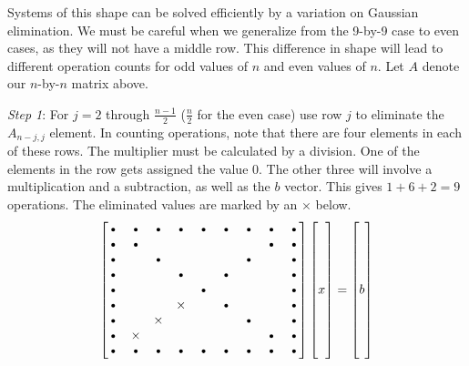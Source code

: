 \documentclass[12pt]{article}
\begin{document}
	Systems of this shape can be solved efficiently by a variation on Gaussian elimination. We must be careful when we generalize from the 9-by-9 case to even cases, as they will not have a middle row. This difference in shape will lead to different operation counts for odd values of $n$ and even values of $n$. Let $A$ denote our $n$-by-$n$ matrix above. \bigbreak
	
	\emph{Step 1}: For  $j=2$ through $\tfrac{n-1}{2}$ ($\tfrac{n}{2}$ for the even case) use row $j$ to eliminate the $A_{n-j, j}$ element. In counting operations, note that there are four elements in each of these rows. The multiplier must be calculated by a division. One of the elements in the row gets assigned the value $0$. The other three will involve a multiplication and a subtraction, as well as the $b$ vector. This gives $1+6+2=9$ operations. The eliminated values are marked by an $\times$ below.
	$$
	\begin{bmatrix}
	\text{\textbullet}&\text{\textbullet}&\text{\textbullet}&\text{\textbullet}&\text{\textbullet}&\text{\textbullet}&\text{\textbullet}&\text{\textbullet}&\text{\textbullet}\\
	\text{\textbullet}&\text{\textbullet}&&&&&&\text{\textbullet}&\text{\textbullet}\\
	\text{\textbullet}&&\text{\textbullet}&&&&\text{\textbullet}&&\text{\textbullet}\\
	\text{\textbullet}&&&\text{\textbullet}&&\text{\textbullet}&&&\text{\textbullet}\\
	\text{\textbullet}&&&&\text{\textbullet}&&&&\text{\textbullet}\\
	\text{\textbullet}&&&\times&&\text{\textbullet}&&&\text{\textbullet}\\
	\text{\textbullet}&&\times&&&&\text{\textbullet}&&\text{\textbullet}\\
	\text{\textbullet}&\times&&&&&&\text{\textbullet}&\text{\textbullet}\\
	\text{\textbullet}&\text{\textbullet}&\text{\textbullet}&\text{\textbullet}&\text{\textbullet}&\text{\textbullet}&\text{\textbullet}&\text{\textbullet}&\text{\textbullet}\\
	\end{bmatrix}\begin{bmatrix}\\ \\ \\ \\ x \\ \\ \\ \\ \\\end{bmatrix}= \begin{bmatrix}\\ \\ \\ \\ b \\ \\ \\ \\ \\\end{bmatrix}
	$$
\end{document}
